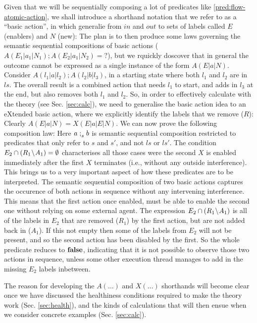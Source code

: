 Given that we will be sequentially composing a lot of predicates
like \ref{pred:flow-atomic-action},
we shall introduce a shorthand notation that we refer to as
a ``basic action'', in which generalie from $in$ and $out$
to sets of labels called $E$ (enablers) and $N$ (new):
The plan is to then produce some laws governing
the semantic sequential compositions of basic actions
($A(E_1|a_1|N_1);A(E_2|a_1|N_2) = ?$),
but we rquickly doscover that
in general the outcome cannot be expressed as a single instance
of the form $A(E|a|N)$.
Consider $A(l_1|a|l_2);A(l_2|b|l_3)$,
in a starting state where both $l_1$ and $l_2$ are in $ls$.
The overall result is a combined action that needs $l_1$
to start, and adds in $l_3$ at the end,
but also removes both $l_1$ and $l_2$.
So, in order to effectively calculate with the theory
(see Sec. \ref{sec:calc}), we need to generalise the basic action idea
to an eXtended basic action,
where we explicitly identify the labels that we remove ($R$):
Clearly $A(E|a|N) = X(E|a|E|N)$.
We can now prove the following composition law:
Here $a \mathrel{;}_s b$ is semantic sequential composition restricted
to predicates that only refer to $s$ and $s'$, and not $ls$  or $ls'$.
The condition $E_2 \cap (R_1\!\setminus\! A_1) = \emptyset$
characterises all those cases were the second $X$ is enabled
immediately after the first $X$ terminates
(i.e., without any outside interference).
This brings us to a very important aspect of how these predicates are to be
interpreted. The semantic sequential composition of two basic actions
captures the occurence of both actions in sequence without any intervening
interference. This means that the first action once enabled,
must be able to enable the second one without relying on some external agent.
The expression $E_2 \cap (R_1\!\setminus\! A_1)$ is all of the labels in $E_2$
that are removed ($R_1$) by the first action, but are not added back in ($A_1$).
If this not empty then some of the labels from $E_2$ will not be present,
and so the second action has been disabled by the first.
So the whole predicate reduces to $\mathbf{false}$,
indicating that it is not possible to observe those two actions in sequence,
unless some other execution thread manages to add in the missing $E_2$ labels
inbetween.

The reason for developing the $A(\dots)$ and $X(\dots)$ shorthands
will become clear once we have discussed the healthiness conditions
required to make the theory work (Sec. \ref{sec:health}), 
and the kinds of calculations that will then ensue
when we consider concrete examples (Sec. \ref{sec:calc}).
